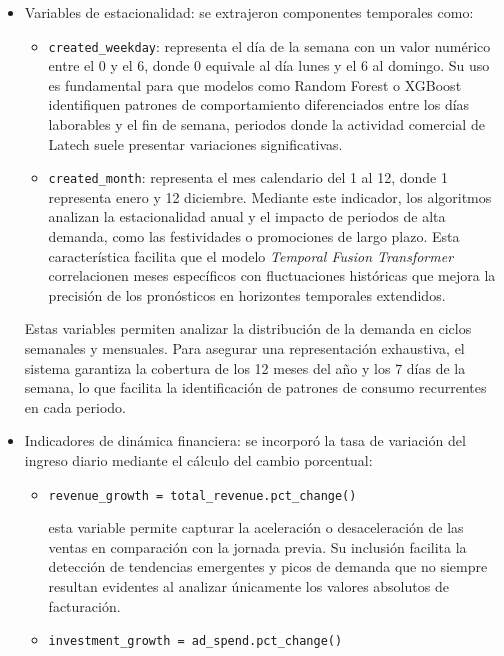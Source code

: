 \begin{itemize}
    \item Variables de estacionalidad: se extrajeron componentes temporales como: 		
    
    \begin{itemize}
	    \item \texttt{created\_weekday}: representa el día de la semana con un valor numérico entre el 0 y el 6, donde 0 equivale al día lunes y el 6 al domingo. Su uso es fundamental para que modelos como Random Forest o XGBoost identifiquen patrones de comportamiento diferenciados entre los días laborables y el fin de semana, periodos donde la actividad comercial de Latech suele presentar variaciones significativas.
	    \item \texttt{created\_month}: representa el mes calendario del 1 al 12, donde 1 representa enero y 12 diciembre. Mediante este indicador, los algoritmos analizan la estacionalidad anual y el impacto de periodos de alta demanda, como las festividades o promociones de largo plazo. Esta característica facilita que el modelo \textit{Temporal Fusion Transformer} correlacionen meses específicos con fluctuaciones históricas que mejora la precisión de los pronósticos en horizontes temporales extendidos.
	    
	\end{itemize}

Estas variables permiten analizar la distribución de la demanda en ciclos semanales y mensuales. Para asegurar una representación exhaustiva, el sistema garantiza la cobertura de los 12 meses del año y los 7 días de la semana, lo que facilita la identificación de patrones de consumo recurrentes en cada periodo.

	\item Indicadores de dinámica financiera: se incorporó la tasa de variación del ingreso diario mediante el cálculo del cambio porcentual: 

	\begin{itemize}
	
		\item \texttt{revenue\_growth = total\_revenue.pct\_change()}

		esta variable permite capturar la aceleración o desaceleración de las ventas en comparación con la jornada previa. Su inclusión facilita la detección de tendencias emergentes y picos de demanda que no siempre resultan evidentes al analizar únicamente los valores absolutos de facturación.

		\item \texttt{investment\_growth = ad\_spend.pct\_change()}
	

\end{itemize}
\end{itemize}
